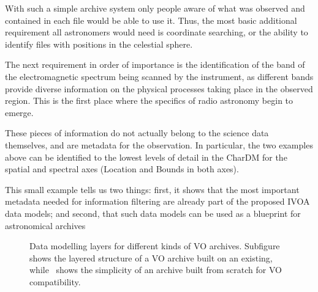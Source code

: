 		With such a simple archive system only people aware of what
		was observed and contained in each file would be able to use
		it. Thus, the most basic additional requirement all
		astronomers would need is coordinate searching, or the
		ability to identify files with positions in the celestial
		sphere.
		
		The next requirement in order of importance is the
		identification of the band of the electromagnetic spectrum
		being scanned by the instrument,  as different bands provide
		diverse information on the physical processes taking place
		in the observed region. This is the first place where the
		specifics of radio astronomy begin to emerge.
		
		These pieces of information  do not actually belong
		to the science data themselves, and are metadata for the
		observation. In particular, the two examples above can be
		identified to the lowest levels of detail in the CharDM
		for the spatial and spectral axes (Location and Bounds in
		both axes).
		
		This small example tells us two things: first, it shows
		that the most important metadata needed for information
		filtering are already part of the proposed IVOA data models;
		and second, that such data models can be used as a
		blueprint for astronomical archives
		
		\begin{figure}[tbp]
			\centering
			
			\hfill 
			\caption[Data modelling layers for different kinds of VO
			archives]
			{
				Data modelling layers for different kinds of VO
				archives. Subfigure
				 shows the
				layered structure of a VO archive built on an
				existing, while~
				shows the simplicity of an archive built from
				scratch for VO compatibility.
			}
			\label{fig:VODalRadamsArchiveLayers}
		\end{figure}
		

